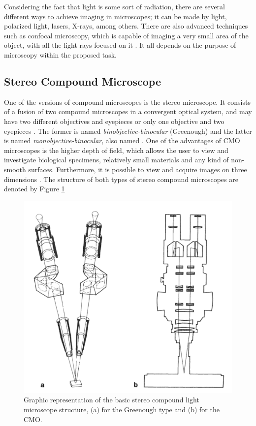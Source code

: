 Considering the fact that light is some sort of radiation, there are several different ways to achieve imaging in microscopes; it can be made by light, polarized light, lasers, X-rays, among others. There are also advanced techniques such as confocal microscopy, which is capable of imaging a very small area of the object, with all the light rays focused on it \cite{rochow1994introduction}. It all depends on the purpose of microscopy within the proposed task.

\subsection{Stereo Compound Microscope}


One of the versions of compound microscopes is the stereo microscope. It consists of a fusion of two compound microscopes in a convergent optical system, and may have two different objectives and eyepieces or only one objective and two eyepieces \cite{schreier2004advances}. The former is named \emph{binobjective-binocular} (Greenough) and the latter is named \emph{monobjective-binocular}, also named . One of the advantages of CMO microscopes is the higher depth of field, which allows the user to view and investigate biological specimens, relatively small materials and any kind of non-smooth surfaces. Furthermore, it is possible to view and acquire images on three dimensions \cite{rochow1994introduction}. The structure of both types of stereo compound microscopes are denoted by Figure \ref{fig:stereo_compound_microscope}

\begin{figure}[H]
	\centering
	\caption{\label{fig:stereo_compound_microscope}Graphic representation of the basic stereo compound light microscope structure, (a) for the Greenough type and (b) for the CMO.}
	\begin{center}
	    \includegraphics[scale=0.4]{images/fig6.png}
	\end{center}
	\centering
\end{figure}